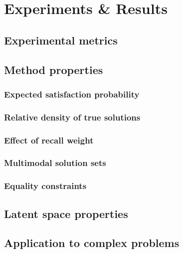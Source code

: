 \documentclass[../../main.tex]{subfiles}
\begin{document}
\chapter{Experiments \& Results}

\section{Experimental metrics}

\section{Method properties}
\subsection{Expected satisfaction probability}
\subsection{Relative density of true solutions}
\subsection{Effect of recall weight}
\subsection{Multimodal solution sets}
\subsection{Equality constraints}

\section{Latent space properties}

\section{Application to complex problems}
\end{document}
